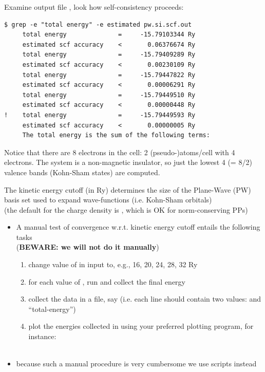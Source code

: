 \documentclass[landscape]{foils}
\begin{document}
Examine output file , look how self-consistency proceeds:
{\codecolor
\begin{verbatim}
$ grep -e "total energy" -e estimated pw.si.scf.out
     total energy              =     -15.79103344 Ry
     estimated scf accuracy    <       0.06376674 Ry
     total energy              =     -15.79409289 Ry
     estimated scf accuracy    <       0.00230109 Ry
     total energy              =     -15.79447822 Ry
     estimated scf accuracy    <       0.00006291 Ry
     total energy              =     -15.79449510 Ry
     estimated scf accuracy    <       0.00000448 Ry
!    total energy              =     -15.79449593 Ry
     estimated scf accuracy    <       0.00000005 Ry
     The total energy is the sum of the following terms:
\end{verbatim}
}
Notice that there are 8 electrons in the cell: 2 (pseudo-)atoms/cell
with 4 electrons. The system is a non-magnetic insulator, so just the 
lowest 4 (= 8/2) valence bands (Kohn-Sham states) are computed.

%
The kinetic energy cutoff  (in Ry) determines the size of
the Plane-Wave (PW) basis set used to expand wave-functions (i.e.
Kohn-Sham orbitals) \\
{\small\gray (the default for the charge density is
  , which is OK for norm-conserving PPs)}

\begin{itemize}
\item A manual test of convergence w.r.t. kinetic energy cutoff entails the
following tasks\\({\bf BEWARE: we will {\burgundy not} do it manually})
\begin{enumerate}
\item change value of  in  
  input to, e.g., 16, 20, 24, 28, 32 Ry
\item for each value of , run  and collect the final energy
\item collect the data in a file, say 
  (i.e. each line should contain two values:  and ``total-energy'')
\item plot the energies collected in  using your preferred
  plotting program, for instance:\\[0.5em]
  \\
\end{enumerate}
\item because such a manual procedure is very cumbersome we use
  scripts instead
\end{itemize}
\end{document}
